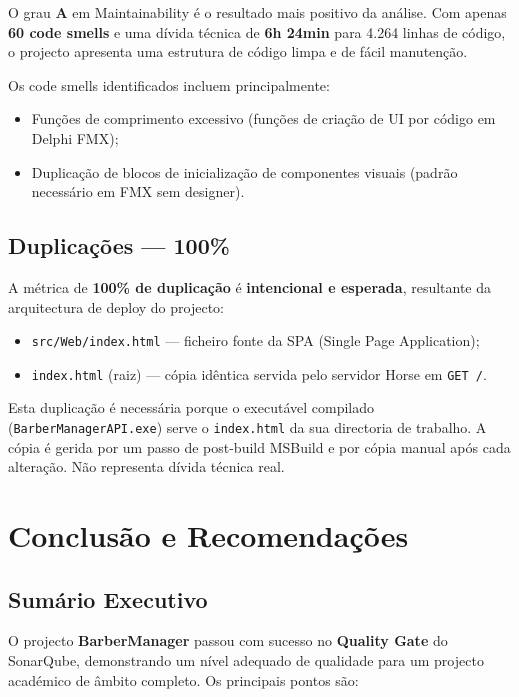 \documentclass[12pt,a4paper]{article}
\begin{document}
O grau \textbf{A} em Maintainability é o resultado mais positivo da análise. Com apenas \textbf{60 code smells} e uma dívida técnica de \textbf{6h 24min} para 4.264 linhas de código, o projecto apresenta uma estrutura de código limpa e de fácil manutenção.

Os code smells identificados incluem principalmente:
\begin{itemize}
    \item Funções de comprimento excessivo (funções de criação de UI por código em Delphi FMX);
    \item Duplicação de blocos de inicialização de componentes visuais (padrão necessário em FMX sem designer).
\end{itemize}

\subsection{Duplicações — 100\%}

A métrica de \textbf{100\% de duplicação} é \textbf{intencional e esperada}, resultante da arquitectura de deploy do projecto:

\begin{itemize}
    \item \texttt{src/Web/index.html} — ficheiro fonte da SPA (Single Page Application);
    \item \texttt{index.html} (raiz) — cópia idêntica servida pelo servidor Horse em \texttt{GET /}.
\end{itemize}

Esta duplicação é necessária porque o executável compilado (\texttt{BarberManagerAPI.exe}) serve o \texttt{index.html} da sua directoria de trabalho. A cópia é gerida por um passo de post-build MSBuild e por cópia manual após cada alteração. Não representa dívida técnica real.

\section{Conclusão e Recomendações}

\subsection{Sumário Executivo}

O projecto \textbf{BarberManager} passou com sucesso no \textbf{Quality Gate} do SonarQube, demonstrando um nível adequado de qualidade para um projecto académico de âmbito completo. Os principais pontos são:
\end{document}
